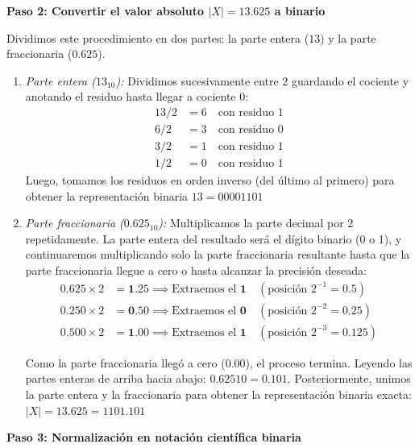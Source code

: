\documentclass[12pt]{article}
\begin{document}
\noindent \textbf{Paso 2: Convertir el valor absoluto $|X| = 13.625$ a binario}

Dividimos este procedimiento en dos partes: la parte entera ($13$) y la parte fraccionaria ($0.625$).

\begin{enumerate}[label=\alph*)]
    \item \textit{Parte entera ($13_{10}$):}    
    Dividimos sucesivamente entre $2$ guardando el cociente y anotando el residuo hasta llegar a cociente $0$:
    \begin{align*}
    13/2 &= 6 \quad \text{con residuo } 1 \\
    6/2 &= 3 \quad \text{con residuo } 0 \\
    3/2 &= 1 \quad \text{con residuo } 1\\
    1/2 &= 0 \quad \text{con residuo } 1
    \end{align*}
    Luego, tomamos los residuos en orden inverso (del último al primero) 
    para obtener la representación binaria $13 = 00001101$

    \item \textit{Parte fraccionaria ($0.625_{10}$):}    
    Multiplicamos la parte decimal por $2$ repetidamente. La parte entera del resultado 
    será el dígito binario (0 o 1), y continuaremos multiplicando solo la parte 
    fraccionaria resultante hasta que la parte fraccionaria llegue 
    a cero o hasta alcanzar la precisión deseada:
    \begin{align*}
    0.625 \times 2 &= \mathbf{1}.25 \implies \text{Extraemos el } \mathbf{1} \quad (\text{posición } 2^{-1} = 0.5) \\
    0.250 \times 2 &= \mathbf{0}.50 \implies \text{Extraemos el } \mathbf{0} \quad (\text{posición } 2^{-2} = 0.25) \\
    0.500 \times 2 &= \mathbf{1}.00 \implies \text{Extraemos el } \mathbf{1} \quad (\text{posición } 2^{-3} = 0.125)
    \end{align*}
    
    Como la parte fraccionaria llegó a cero ($0.00$), 
    el proceso termina. Leyendo las partes enteras de arriba hacia abajo:
    $    0.62510= 0.101 $. Posteriormente, unimos la parte entera y la fraccionaria 
    para obtener la representación binaria exacta: $|X| = 13.625 = 1101.101$
\end{enumerate}

\vspace{0.5em}

\noindent \textbf{Paso 3: Normalización en notación científica binaria}
\end{document}
